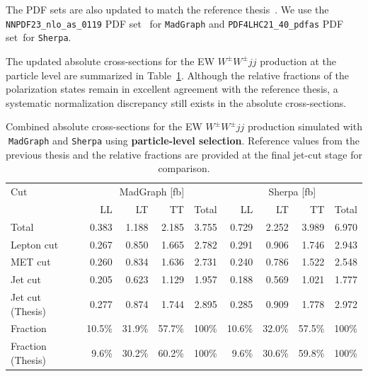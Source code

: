 \documentclass[12pt]{article}
\begin{document}
        The PDF sets are also updated to match the reference thesis~\cite{stange2025longitudinal}. We use the \verb|NNPDF23_nlo_as_0119| PDF set~\cite{Ball:2012cx} for \verb|MadGraph| and \verb|PDF4LHC21_40_pdfas| PDF set~\cite{PDF4LHCWorkingGroup:2022cjn}for \verb|Sherpa|.

        The updated absolute cross-sections for the EW $W^{\pm}W^{\pm}jj$ production at the particle level are summarized in Table~\ref{tab:combined_WWjj_cross_section_particle_level}. Although the relative fractions of the polarization states remain in excellent agreement with the reference thesis, a systematic normalization discrepancy still exists in the absolute cross-sections.

        \begin{table}[htpb]
            \centering
            \caption{Combined absolute cross-sections for the EW $W^{\pm}W^{\pm}jj$ production simulated with \texttt{MadGraph} and \texttt{Sherpa} using \textbf{particle-level selection}. Reference values from the previous thesis and the relative fractions are provided at the final jet-cut stage for comparison.}
            \label{tab:combined_WWjj_cross_section_particle_level}
            \begin{tabular}{l|rrrr|rrrr}
                \hline
                Cut               & \multicolumn{4}{c|}{MadGraph [fb]} & \multicolumn{4}{c}{Sherpa [fb]}  \\
                                  & LL      & LT      & TT     & Total & LL     & LT     & TT     & Total \\ \hline
                Total             & 0.383   & 1.188   & 2.185  & 3.755 & 0.729  & 2.252  & 3.989  & 6.970 \\
                Lepton cut        & 0.267   & 0.850   & 1.665  & 2.782 & 0.291  & 0.906  & 1.746  & 2.943 \\
                MET cut           & 0.260   & 0.834   & 1.636  & 2.731 & 0.240  & 0.786  & 1.522  & 2.548 \\
                Jet cut           & 0.205   & 0.623   & 1.129  & 1.957 & 0.188  & 0.569  & 1.021  & 1.777 \\ \hline
                Jet cut (Thesis)  & 0.277   & 0.874   & 1.744  & 2.895 & 0.285  & 0.909  & 1.778  & 2.972 \\ \hline
                Fraction          & 10.5\%  & 31.9\%  & 57.7\% & 100\% & 10.6\% & 32.0\% & 57.5\% & 100\% \\
                Fraction (Thesis) & 9.6\%   & 30.2\%  & 60.2\% & 100\% & 9.6\%  & 30.6\% & 59.8\% & 100\% \\ \hline
            \end{tabular}
        \end{table}
\end{document}
